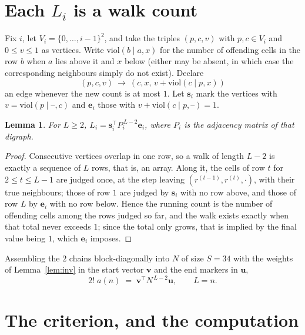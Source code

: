\documentclass[11pt,a4paper]{article}
\theoremstyle{plain}
\newtheorem{lemma}[theorem]{Lemma}
\theoremstyle{definition}
\begin{document}
\section{Each $L_i$ is a walk count}

Fix $i$, let $V_i=\{0,\dots,i-1\}^{2}$, and take the triples $(p,c,v)$ with
$p,c\in V_i$ and $0\le v\le1$ as vertices. Write $\mathrm{viol}(b\mid a,x)$ for the number
of offending cells in the row $b$ when $a$ lies above it and $x$ below (either may be
absent, in which case the corresponding neighbours simply do not exist). Declare
\[
(p,c,v)\ \longrightarrow\ (c,x,\,v+\mathrm{viol}(c\mid p,x))
\]
an edge whenever the new count is at most $1$. Let $\mathbf{s}_i$ mark the vertices with
$v=\mathrm{viol}(p\mid\text{--},c)$ and $\mathbf{e}_i$ those with
$v+\mathrm{viol}(c\mid p,\text{--})=1$.

\begin{lemma}\label{lem:walk}
For $L\ge2$, $L_i=\mathbf{s}_i^{\!\top}P_i^{\,L-2}\mathbf{e}_i$, where $P_i$ is the
adjacency matrix of that digraph.
\end{lemma}

\begin{proof}
Consecutive vertices overlap in one row, so a walk of length $L-2$ is exactly a sequence
of $L$ rows, that is, an array. Along it, the cells of row $t$ for $2\le t\le L-1$ are
judged once, at the step leaving $(r^{(t-1)},r^{(t)},\cdot)$, with their true neighbours;
those of row $1$ are judged by $\mathbf{s}_i$ with no row above, and those of row
$L$ by $\mathbf{e}_i$ with no row below. Hence the running count is the number of
offending cells among the rows judged so far, and the walk exists exactly when that total
never exceeds $1$; since the total only grows, that is implied by the final value being
$1$, which $\mathbf{e}_i$ imposes.
\end{proof}

Assembling the $2$ chains block-diagonally into $N$ of size $S=34$ with the weights of
Lemma~\ref{lem:inv} in the start vector $\mathbf{v}$ and the end markers in
$\mathbf{u}$,
\begin{equation}\label{eq:walk2}
2!\;a(n)\;=\;\mathbf{v}^{\!\top}N^{\,L-2}\mathbf{u},\qquad L=n .
\end{equation}

\section{The criterion, and the computation}
\end{document}
